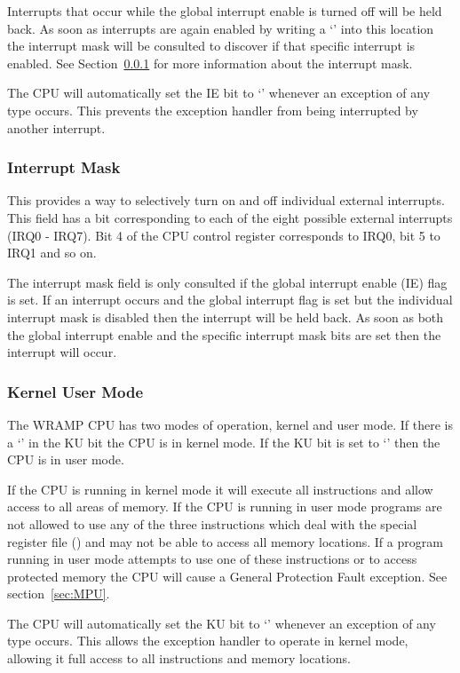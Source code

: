 Interrupts that occur while the global interrupt enable is turned off
will be held back. As soon as interrupts are again enabled by writing
a `' into this location the interrupt mask will be consulted
to discover if that specific interrupt is enabled. See
Section~\ref{sec:imask} for more information about the interrupt mask.

The CPU will automatically set the IE bit to `' whenever an
exception of any type occurs. This prevents the exception handler
from being interrupted by another interrupt.

\subsubsection{Interrupt Mask}
\label{sec:imask}

This provides a way to selectively turn on and off individual external
interrupts. This field has a bit corresponding to each of the eight
possible external interrupts (IRQ0 - IRQ7). Bit 4 of the CPU control
register corresponds to IRQ0, bit 5 to IRQ1 and so on.

The interrupt mask field is only consulted if the global interrupt
enable (IE) flag is set. If an interrupt occurs and the global
interrupt flag is set but the individual interrupt mask is disabled
then the interrupt will be held back. As soon as both the global
interrupt enable and the specific interrupt mask bits are set then the
interrupt will occur.

\subsubsection{Kernel User Mode}

The WRAMP CPU has two modes of operation, kernel and user mode. If
there is a `' in the KU bit the CPU is in kernel mode. If
the KU bit is set to `' then the CPU is in user mode. 

If the CPU is running in kernel mode it will execute all instructions and
allow access to all areas of memory. If the CPU is running in user
mode programs are not allowed to use any of the three instructions
which deal with the special register file ()
and may not be able to access all memory locations. If a program
running in user mode attempts to use one of these instructions or to
access protected memory the CPU will cause a General Protection Fault
exception. See section~\ref{sec:MPU}.

The CPU will automatically set the KU bit to `' whenever an
exception of any type occurs. This allows the exception handler to
operate in kernel mode, allowing it full access to all instructions
and memory locations.

